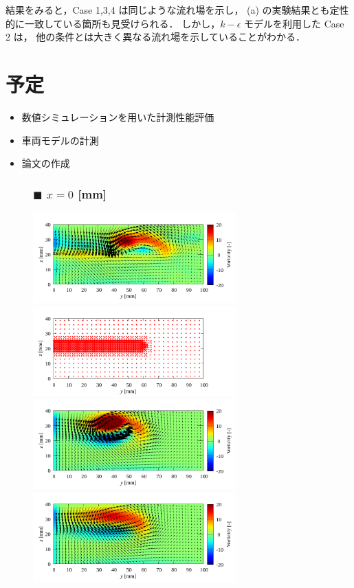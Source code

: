 \documentclass[twocolumn,a4j]{jsarticle}
\begin{document}
結果をみると，Case 1,3,4 は同じような流れ場を示し，
(a) の実験結果とも定性的に一致している箇所も見受けられる．
しかし，$k-\epsilon$ モデルを利用した Case 2 は，
他の条件とは大きく異なる流れ場を示していることがわかる．

\section{予定}
\begin{itemize}
	\item 数値シミュレーションを用いた計測性能評価
	\item 車両モデルの計測
	\item 論文の作成
\end{itemize}

\newpage
\begin{figure}[htbp]
	\subsubsection*{$\blacksquare$ $x=0$ [mm]}
	\centering
	{
		\includegraphics[keepaspectratio, width=78mm]{../images/Simulation/Compare/experiment_x=0.png}
		\includegraphics[keepaspectratio, width=78mm]{../images/Simulation/0_Mesh/x=0.png}
		\includegraphics[keepaspectratio, width=78mm]{../images/Simulation/1_Laminar/x=0.png}
		\includegraphics[keepaspectratio, width=78mm]{../images/Simulation/2_kEpsilon/x=0.png}
}
\end{figure}
\end{document}
